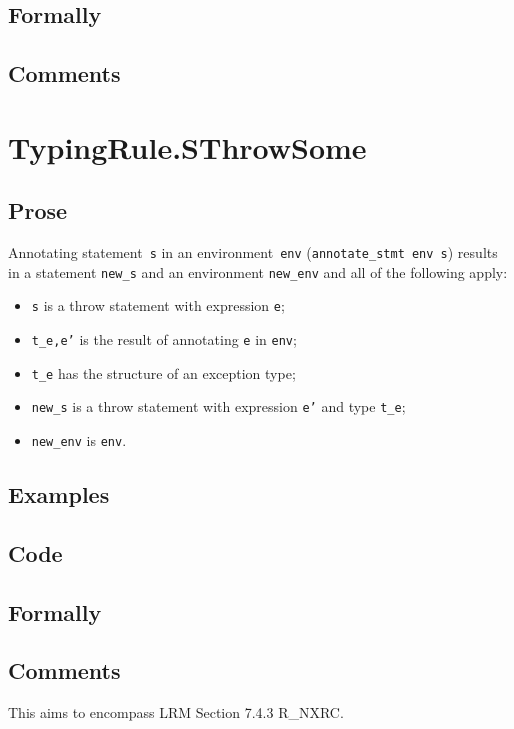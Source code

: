 \documentclass{book}
\begin{document}
  \subsection{Formally}

  \subsection{Comments}


\section{TypingRule.SThrowSome \label{sec:TypingRule.SThrowSome}}

  \subsection{Prose}
Annotating statement~\texttt{s} in an environment~\texttt{env}
(\texttt{annotate\_stmt env s}) results in a statement \texttt{new\_s} and an
environment \texttt{new\_env} and all of the following apply:
   \begin{itemize}
   \item \texttt{s} is a throw statement with expression \texttt{e};
   \item \texttt{t\_e,e'} is the result of annotating \texttt{e} in \texttt{env};
   \item \texttt{t\_e} has the structure of an exception type;
   \item \texttt{new\_s} is a throw statement with expression \texttt{e'} and type \texttt{t\_e};
   \item \texttt{new\_env} is \texttt{env}.
   \end{itemize}

  \subsection{Examples}

  \subsection{Code}

  \subsection{Formally}

  \subsection{Comments}
    This aims to encompass LRM Section 7.4.3 R\_NXRC.
\end{document}
